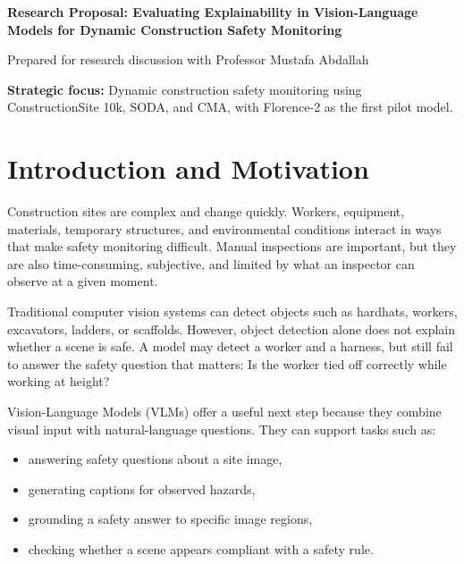 \documentclass[11pt,letterpaper]{article}
\begin{document}
\begin{center}
{\Large\bfseries\color{inkblue} Research Proposal: Evaluating Explainability in Vision-Language Models for Dynamic Construction Safety Monitoring\par}
\vspace{5pt}
{\normalsize\color{mutedgray} Prepared for research discussion with Professor Mustafa Abdallah\par}
\end{center}

\vspace{5pt}
\noindent
\colorbox{tablefill}{%
  \parbox{\dimexpr\linewidth-2\fboxsep\relax}{%
  \textbf{\color{darkblue}Strategic focus:} Dynamic construction safety monitoring using ConstructionSite 10k, SODA, and CMA, with Florence-2 as the first pilot model.
  }%
}

\section{Introduction and Motivation}

Construction sites are complex and change quickly. Workers, equipment, materials, temporary structures, and environmental conditions interact in ways that make safety monitoring difficult. Manual inspections are important, but they are also time-consuming, subjective, and limited by what an inspector can observe at a given moment.

Traditional computer vision systems can detect objects such as hardhats, workers, excavators, ladders, or scaffolds. However, object detection alone does not explain whether a scene is safe. A model may detect a worker and a harness, but still fail to answer the safety question that matters: Is the worker tied off correctly while working at height?

Vision-Language Models (VLMs) offer a useful next step because they combine visual input with natural-language questions. They can support tasks such as:

\begin{itemize}
  \item answering safety questions about a site image,
  \item generating captions for observed hazards,
  \item grounding a safety answer to specific image regions,
  \item checking whether a scene appears compliant with a safety rule.
\end{itemize}
\end{document}

